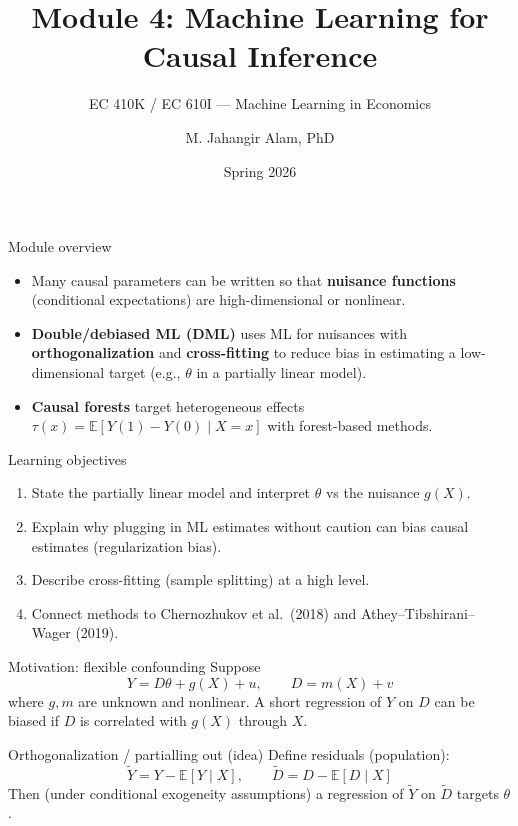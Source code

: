 \documentclass[aspectratio=169,11pt]{beamer}
\title[Causal ML]{Module 4: Machine Learning for Causal Inference}
\subtitle{EC 410K / EC 610I --- Machine Learning in Economics}
\author{M. Jahangir Alam, PhD}
\institute{Wilfrid Laurier University}
\date{Spring 2026}
\begin{document}
\begin{frame}[plain]
  \titlepage
\end{frame}

\begin{frame}{Module overview}
  \begin{itemize}
    \item Many causal parameters can be written so that \textbf{nuisance functions} (conditional expectations) are high-dimensional or nonlinear.
    \item \textbf{Double/debiased ML (DML)} uses ML for nuisances with \textbf{orthogonalization} and \textbf{cross-fitting} to reduce bias in estimating a low-dimensional target (e.g., \(\theta\) in a partially linear model).
    \item \textbf{Causal forests} target heterogeneous effects \(\tau(x)=\mathbb{E}[Y(1)-Y(0)\mid X=x]\) with forest-based methods.
  \end{itemize}
\end{frame}

\begin{frame}{Learning objectives}
  \begin{enumerate}
    \item State the partially linear model and interpret \(\theta\) vs the nuisance \(g(X)\).
    \item Explain why plugging in ML estimates without caution can bias causal estimates (regularization bias).
    \item Describe cross-fitting (sample splitting) at a high level.
    \item Connect methods to Chernozhukov et al.\ (2018) and Athey--Tibshirani--Wager (2019).
  \end{enumerate}
\end{frame}

\begin{frame}{Motivation: flexible confounding}
  Suppose
  \[
    Y = D\theta + g(X) + u,\qquad D = m(X) + v
  \]
  where \(g,m\) are unknown and nonlinear. A short regression of \(Y\) on \(D\) can be biased if \(D\) is correlated with \(g(X)\) through \(X\).
\end{frame}

\begin{frame}{Orthogonalization / partialling out (idea)}
  Define residuals (population):
  \[
    \tilde Y = Y - \mathbb{E}[Y\mid X],\qquad \tilde D = D - \mathbb{E}[D\mid X]
  \]
  Then (under conditional exogeneity assumptions) a regression of \(\tilde Y\) on \(\tilde D\) targets \(\theta\).
\end{frame}
\end{document}
